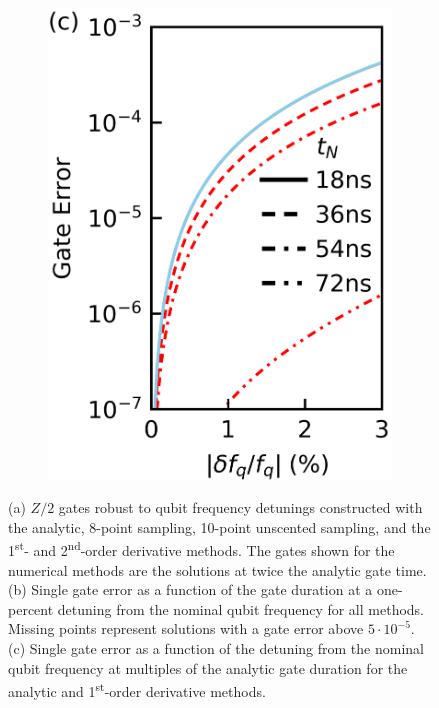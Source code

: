 \documentclass[
  amsfonts,
  amsmath,
  tbtags,
  amssymb,
  aps,
  nobibnotes,
  twocolumn,
  superscriptaddress,
]{revtex4-2}
\begin{document}
\begin{figure}[ht]
  \begin{subfigure}{.23\textwidth}
    \includegraphics[width=\linewidth]{assets/f2b.png}
  \end{subfigure}
  
  \caption{
    (a) $Z/2$ gates robust to qubit frequency detunings constructed with the
    analytic, 8-point sampling, 10-point unscented sampling, and the 1\textsuperscript{st}-
    and 2\textsuperscript{nd}-order derivative methods. The gates
    shown for the numerical methods are the solutions at twice the analytic
    gate time.
    (b) Single gate error as
    a function of the gate duration at a one-percent
    detuning from the nominal qubit frequency for all methods. Missing
    points represent solutions with a gate error above $5 \cdot 10^{-5}$.
    (c) Single gate error as a function of the detuning from the nominal
    qubit frequency at multiples of the analytic gate duration for the analytic
    and 1\textsuperscript{st}-order derivative methods.
  }
\end{figure}
\end{document}
